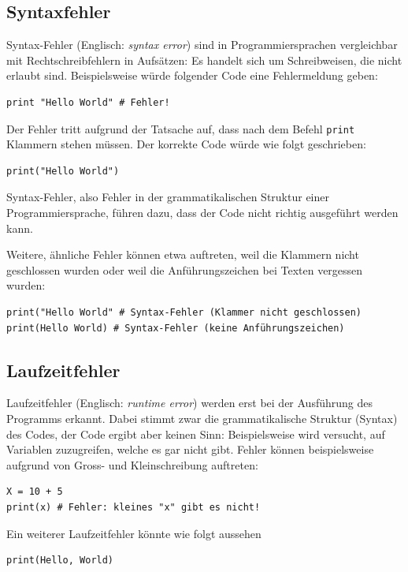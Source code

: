 \subsection{Syntaxfehler}
Syntax-Fehler (Englisch: \emph{syntax error}) sind in Programmiersprachen vergleichbar mit Rechtschreibfehlern in Aufsätzen: Es handelt sich um Schreibweisen, die nicht erlaubt sind. Beispielsweise würde folgender Code eine Fehlermeldung geben:

\begin{lstlisting}
print "Hello World" # Fehler!
\end{lstlisting}
Der Fehler tritt aufgrund der Tatsache auf, dass nach dem Befehl \lstinline|print| Klammern stehen müssen. Der korrekte Code würde wie folgt geschrieben:
\begin{lstlisting}
print("Hello World")
\end{lstlisting}

Syntax-Fehler, also Fehler in der grammatikalischen Struktur einer Programmiersprache, führen dazu, dass der Code nicht richtig ausgeführt werden kann.

Weitere, ähnliche Fehler können etwa auftreten, weil die Klammern nicht geschlossen wurden oder weil die Anführungszeichen bei Texten vergessen wurden:

\begin{lstlisting}
print("Hello World" # Syntax-Fehler (Klammer nicht geschlossen)
print(Hello World) # Syntax-Fehler (keine Anführungszeichen)
\end{lstlisting}

\subsection{Laufzeitfehler}
Laufzeitfehler (Englisch: \emph{runtime error}) werden erst bei der Ausführung des Programms erkannt. Dabei stimmt zwar die grammatikalische Struktur (Syntax) des Codes, der Code ergibt aber keinen Sinn: Beispielsweise wird versucht, auf Variablen zuzugreifen, welche es gar nicht gibt. Fehler können beispielsweise aufgrund von Gross- und Kleinschreibung auftreten:

\begin{lstlisting}
X = 10 + 5
print(x) # Fehler: kleines "x" gibt es nicht!
\end{lstlisting}

Ein weiterer Laufzeitfehler könnte wie folgt aussehen

\begin{lstlisting}
print(Hello, World)
\end{lstlisting}

